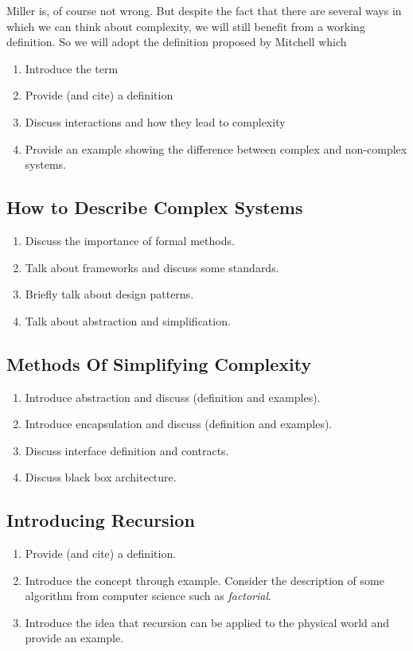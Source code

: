 \documentclass[jou,apacite]{apa6}
\begin{document}
Miller is, of course not wrong.  But despite the fact that there are several ways in which we can think about complexity, we will still benefit from a working definition.  So we will adopt the definition proposed by Mitchell which 

\begin{enumerate}
  \item Introduce the term
  \item Provide (and cite) a definition
  \item Discuss interactions and how they lead to complexity
  \item Provide an example showing the difference between complex and non-complex systems.
\end{enumerate}

\subsection{How to Describe Complex Systems}  %
\begin{enumerate}
  \item Discuss the importance of formal methods.
  \item Talk about frameworks and discuss some standards.
  \item Briefly talk about design patterns.
  \item Talk about abstraction and simplification.
\end{enumerate}

\subsection{Methods Of Simplifying Complexity}  %
\begin{enumerate}
  \item Introduce abstraction and discuss (definition and examples).
  \item Introduce encapsulation and discuss (definition and examples).
  \item Discuss interface definition and contracts.
  \item Discuss black box architecture.
\end{enumerate}

\subsection{Introducing Recursion}  %
\begin{enumerate}
  \item Provide (and cite) a definition.
  \item Introduce the concept through example.  Consider the description of some algorithm from computer science such as \emph{factorial}.
  \item Introduce the idea that recursion can be applied to the physical world and provide an example.
\end{enumerate}
\end{document}
